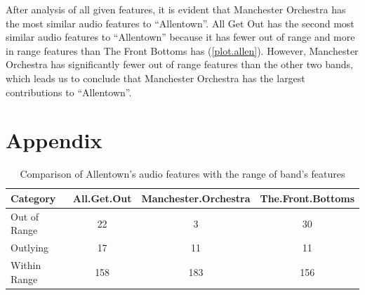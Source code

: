 \documentclass{article}\usepackage[]{graphicx}\usepackage[]{xcolor}
\begin{document}
\begin{multicols}{2}
After analysis of all given features, it is evident that Manchester Orchestra has the most similar audio features to ``Allentown''. All Get Out has the second most similar audio features to ``Allentown'' because it has fewer out of range and more in range features than The Front Bottoms has (\ref{plot.allen}). However, Manchester Orchestra has significantly fewer out of range features than the other two bands, which leads us to conclude that Manchester Orchestra has the largest contributions to ``Allentown''.

\vspace{2em}
\begin{tiny}

\end{tiny}
\end{multicols}

\newpage
\onecolumn
\section{Appendix}
\begin{table}[ht]
\centering
\begin{tabular}{|l|c|c|c|}
  \hline
Category & All.Get.Out & Manchester.Orchestra & The.Front.Bottoms \\ 
  \hline
Out of Range &  22 &   3 &  30 \\ 
  Outlying &  17 &  11 &  11 \\ 
  Within Range & 158 & 183 & 156 \\ 
   \hline
\end{tabular}
\caption{Comparison of Allentown's audio features with the range of band's features} 
\label{allentown.tab}
\end{table}
\end{document}
